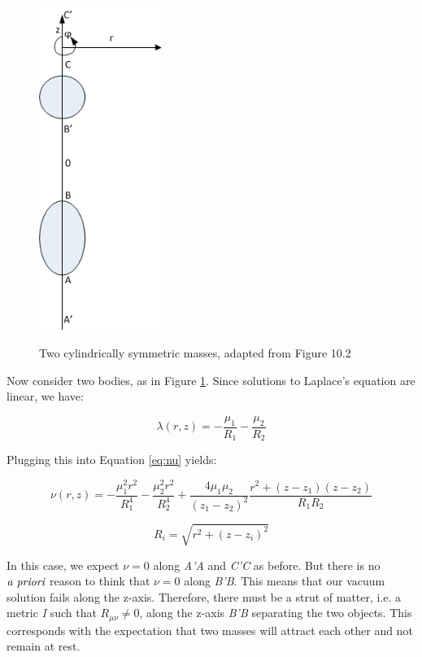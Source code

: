 \documentclass{article}
\begin{document}
\begin{figure}
\centering
\caption[Two cylindrically symmetric masses]
{Two cylindrically symmetric masses, adapted from \cite{synge_relativity} Figure 10.2}
\includegraphics[width=40mm]{Figure2.png}
\label{fig:two-masses}
\end{figure}


Now consider two bodies, as in Figure \ref{fig:two-masses}. Since solutions to Laplace's equation are linear, we have:

\begin{equation}
\lambda (r,z)=-\frac{\mu_{1}}{R_{1}}-\frac{\mu_{2}}{R_{2}}\label{eq:2-m}
\end{equation}

Plugging this into Equation \eqref{eq:nu} yields:

\begin{equation}
\nu (r,z)=-\frac{\mu_{1}^{2}r^{2}}{R_{1}^{4}}-\frac{\mu_{2}^{2}r^{2}}{R_{2}^{4}}+\frac{4\mu_{1}\mu_{2}}{\left(z_{1}-z_{2}\right)^{2}}\frac{r^{2}+\left(z-z_{1}\right)\left(z-z_{2}\right)}{R_{1}R_{2}}
\end{equation}

\begin{equation}
R_{i}=\sqrt{r^{2}+\left(z-z_{i}\right)^{2}}
\end{equation}

In this case, we expect $\nu=0$ along \emph{A'A} and \emph{C'C} as before. But there is no $\emph{a priori}$ reason to think that $\nu=0$ along \emph{B'B}.
This means that our vacuum solution fails along the z-axis. Therefore, there must be a strut of matter, i.e. a metric \emph{I} such that $R_{\mu\nu}\neq 0$, along the z-axis \emph{B'B} separating the two objects. This corresponds with the expectation that two masses will attract each other and not remain at rest.
\end{document}
